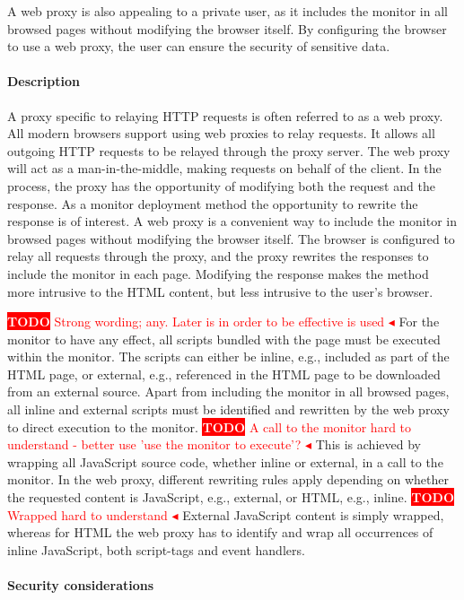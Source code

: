 \documentclass{llncs}
\newcommand{\todo}[1]{\colorbox{red}{\textcolor{white}{\sffamily\bfseries\scriptsize TODO}} \textcolor{red}{#1} \textcolor{red}{$\blacktriangleleft$}}
\begin{document}
A web proxy is also appealing to a private user, as it includes the monitor in all browsed pages without modifying 
the browser itself. By configuring the browser to use a web proxy, the user can ensure the security 
of sensitive data.

\paragraph{Description}
A proxy specific to relaying HTTP requests is often referred to as a web proxy.
All modern browsers support using web proxies to relay requests.
It allows all outgoing HTTP requests to be 
relayed through the proxy server. The web proxy will act as a man-in-the-middle, making 
requests on behalf of the client. In the process, the proxy has the 
opportunity of modifying both the request and the response. 
As a monitor deployment method the opportunity to rewrite the response is 
of interest. A web proxy is a convenient way to include the monitor in browsed pages without 
modifying the browser itself. The browser is configured to relay 
all requests through the proxy, and the proxy rewrites the responses to include 
the monitor in each page. Modifying the response makes the method more 
intrusive to the HTML content, but less intrusive to the user's browser. 

\todo{Strong wording; any. Later is in order to be effective is used}
For the monitor to have any effect, all scripts bundled with 
the page must be executed within the monitor. The scripts can either be inline, 
e.g., included as part of the HTML page, or external, e.g., referenced in the 
HTML page to be downloaded from an external source.
Apart from including the monitor in all browsed pages, all inline and external 
scripts must be identified and rewritten by the web proxy to direct execution to the monitor.
\todo{A call to the monitor hard to understand - better use 'use the monitor to execute'?}
This is achieved by wrapping all JavaScript source code, whether inline or external, in a call to the monitor.
In the web proxy, different rewriting rules apply depending on whether the 
requested content is JavaScript, e.g., external, or HTML, e.g., inline. 
\todo{Wrapped hard to understand}
External 
JavaScript content is simply wrapped, whereas 
for HTML the web proxy has to identify and wrap all occurrences of inline 
JavaScript, both script-tags and event handlers.


\paragraph{Security considerations}
\end{document}
